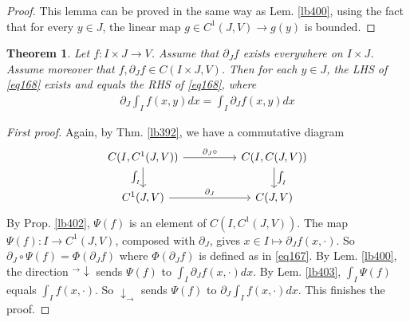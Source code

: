 \documentclass[12pt,b5paper,notitlepage]{article}
\theoremstyle{definition}
\theoremstyle{plain}
\newtheorem{thm}[df]{Theorem}
\numberwithin{equation}{section}
\begin{document}
\begin{proof}
This lemma can be proved in the same way as Lem. \ref{lb400}, using the fact that for every $y\in J$, the linear map $g\in C^1(J,V)\rightarrow g(y)$ is bounded.
\end{proof}



\begin{comment}
The inclusion map
\begin{align}
\kappa:C^1(J,V)\rightarrow C(J,V)\qquad g\mapsto g
\end{align}
is a bounded linear map (with operator norm $\leq 1$). What we really want to prove is that $\kappa(\int_I\Psi(f))$, which is an element of $C(J,V)$, is given by the function $y\mapsto \int_If(x,y)dx$. By Thm. \ref{lb392}, we have $\kappa(\int_I\Psi(f))=\int_I\kappa\circ\Psi(f)=\int_I\Phi(f)$ where $\Phi(f)$ is defined as in \eqref{eq167}, i.e. $\Phi(f)(x)=f(x,\cdot)$. By Lem. \ref{lb400}, $\int_I\Phi(f)$ is the function $y\mapsto\int_If(x,y)dx$. This finishes the proof.
\end{comment}



\begin{thm}\label{lb405}
Let $f:I\times J\rightarrow V$. Assume that $\partial_Jf$ exists everywhere on $I\times J$. Assume moreover that $f,\partial_Jf\in C(I\times J,V)$. Then for each $y\in J$, the LHS of \eqref{eq168} exists and equals the RHS of \eqref{eq168}, where
\begin{align}
\partial_J\int_I f(x,y)dx=\int_I\partial_J f(x,y)dx  \label{eq168}
\end{align}
\end{thm}


\begin{proof}[First proof]
Again, by Thm. \ref{lb392}, we have a commutative diagram
\begin{equation*}
\begin{tikzcd}[column sep=huge]
C(I,C^1(J,V)) \arrow[r,"\partial_J\circ"] \arrow[d,"\int_I"'] & C(I,C(J,V)) \arrow[d,"\int_I"] \\
C^1(J,V) \arrow[r,"\partial_J"]           & C(J,V)         
\end{tikzcd} 
\end{equation*}
By Prop. \ref{lb402}, $\Psi(f)$ is an element of $C(I,C^1(J,V))$. The map $\Psi(f):I\rightarrow C^1(J,V)$, composed with $\partial_J$, gives $x\in I\mapsto\partial_Jf(x,\cdot)$. So $\partial_J\circ\Psi(f)=\Phi(\partial_Jf)$ where $\Phi(\partial_Jf)$ is defined as in \eqref{eq167}. By Lem. \ref{lb400}, the direction ${}^\rightarrow\!\downarrow$ sends $\Psi(f)$ to $\int_I\partial_J f(x,\cdot)dx$. By Lem. \ref{lb403}, $\int_I\Psi(f)$ equals $\int_I f(x,\cdot)$. So $\downarrow_\rightarrow$ sends $\Psi(f)$ to $\partial_J\int_I f(x,\cdot)dx$. This finishes the proof.
\end{proof}
\end{document}
